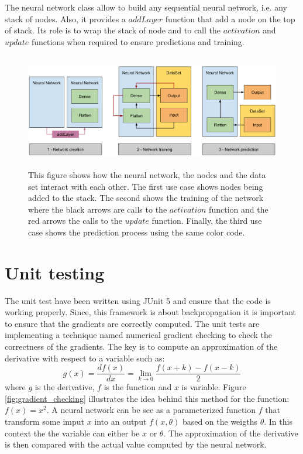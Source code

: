 \documentclass[11pt]{report}
\begin{document}
The neural network class allow to build any sequential neural network, i.e. any stack of nodes. Also, it provides a $addLayer$ function that add a node on the top of stack. Its role is to wrap the stack of node and to call the $activation$ and $update$ functions when required to ensure predictions and training.

\begin{figure}[h]
\centering
\includegraphics[width=15cm, height=5cm]{neural_network}
\caption{This figure shows how the neural network, the nodes and the data set interact with each other. The first use case shows nodes being added to the stack. The second shows the training of the network where the black arrows are calls to the $activation$ function and the red arrows the calls to the $update$ function. Finally, the third use case shows the prediction process using the same color code.}
\end{figure}

\section{Unit testing}

The unit test have been written using JUnit 5 and ensure that the code is working properly. Since, this framework is about backpropagation it is important to ensure that the gradients are correctly computed. The unit tests are implementing a technique named numerical gradient checking to check the correctness of the gradients. The key is to compute an approximation of the derivative with respect to a variable such as:
\begin{equation}
g(x) = \frac{df(x)}{dx} = \lim_{k\to0} \frac{f(x + k) - f(x - k)}{2}
\end{equation}
where $g$ is the derivative, $f$ is the function and $x$ is variable.
Figure \ref{fig:gradient_checking} illustrates the idea behind this method for the function: $f(x) = x^{2}$. A neural network can be see as a parameterized function $f$ that transform some imput $x$ into an output $f(x, \theta)$ based on the weigths $\theta$. In this context the the variable can either be $x$ or $\theta$. The approximation of the derivative is then compared with the actual value computed by the neural network.
\end{document}
